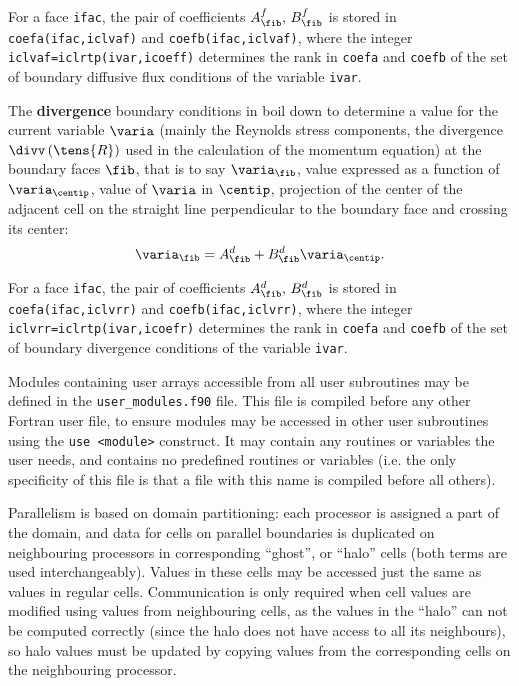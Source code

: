 {{{For a face \texttt{ifac}, the pair of coefficients $A_{\fib}^f , \, B_{\fib}^f$ is
stored in \texttt{coefa(ifac,iclvaf)} and
\texttt{coefb(ifac,iclvaf)}, where the integer \texttt{iclvaf=iclrtp(ivar,icoeff)}
determines the rank in \texttt{coefa} and \texttt{coefb} of the set of boundary
diffusive flux conditions of the variable \texttt{ivar}. 

The \textbf{divergence} boundary conditions in \CS boil down to determine a value for the
current variable $\varia$ (mainly the Reynolds stress components, the divergence $\divv \left(\tens{R} \right)$ used in the calculation of the momentum equation) at the boundary faces $\fib$, 
that is to say $\varia_\fib$,
value expressed as a function of $\varia_{\centip}$, value of $\varia$ in $\centip$,
projection of the center of the adjacent cell on the straight line
perpendicular to the boundary face and crossing its center:
\begin{equation}
\varia_\fib=A_{\fib}^d +B_{\fib}^d \varia_{\centip}.
\end{equation}

For a face \texttt{ifac}, the pair of coefficients $A_{\fib}^d , \, B_{\fib}^d$ is
stored in \texttt{coefa(ifac,iclvrr)} and
\texttt{coefb(ifac,iclvrr)}, where the integer \texttt{iclvrr=iclrtp(ivar,icoefr)}
determines the rank in \texttt{coefa} and \texttt{coefb} of the set of boundary
divergence conditions of the variable \texttt{ivar}. 

\clearpage
Modules containing user arrays accessible from all user subroutines may
be defined in the \texttt{user\_modules.f90} file. This file is
compiled before any other Fortran user file, to ensure modules
may be accessed in other user subroutines using the \texttt{use <module>}
construct. It may contain any routines or variables the user needs,
and contains no predefined routines or variables (i.e. the only
specificity of this file is that a file with this name is compiled before
all others).


Parallelism is based on domain partitioning: each processor is assigned
a part of the domain, and data for cells on parallel boundaries
is duplicated on neighbouring processors in corresponding ``ghost'',
or ``halo'' cells (both terms are used interchangeably). Values in
these cells may be accessed just the same as values in regular cells.
Communication is only required when cell values are modified
using values from neighbouring cells, as the values in the ``halo'' can
not be computed correctly (since the halo does not have access to all
its neighbours), so halo values must be updated by copying values from
the corresponding cells on the neighbouring processor.

}}}
